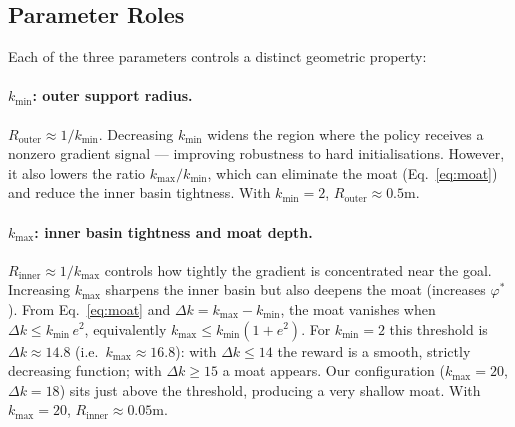 \documentclass{article}
\begin{document}
\subsection{Parameter Roles}

Each of the three parameters controls a distinct geometric property:

\paragraph{$k_{\min}$: outer support radius.}
$R_{\mathrm{outer}} \approx 1/k_{\min}$. Decreasing $k_{\min}$ widens the region where
the policy receives a nonzero gradient signal --- improving robustness to hard
initialisations. However, it also lowers the ratio $k_{\max}/k_{\min}$, which can
eliminate the moat (Eq.~\eqref{eq:moat}) and reduce the inner basin tightness.
With $k_{\min}=2$, $R_{\mathrm{outer}} \approx 0.5$m.

\paragraph{$k_{\max}$: inner basin tightness and moat depth.}
$R_{\mathrm{inner}} \approx 1/k_{\max}$ controls how tightly the gradient is
concentrated near the goal. Increasing $k_{\max}$ sharpens the inner basin but also
deepens the moat (increases $\varphi^*$). From Eq.~\eqref{eq:moat} and
$\Delta k = k_{\max} - k_{\min}$, the moat vanishes when $\Delta k \leq k_{\min}\,e^2$,
equivalently $k_{\max} \leq k_{\min}(1+e^2)$. For $k_{\min}=2$ this threshold is
$\Delta k \approx 14.8$ (i.e.\ $k_{\max} \approx 16.8$): with $\Delta k \leq 14$ the
reward is a smooth, strictly decreasing function; with $\Delta k \geq 15$ a moat
appears. Our configuration ($k_{\max}=20$, $\Delta k = 18$) sits just above the threshold,
producing a very shallow moat. With $k_{\max}=20$, $R_{\mathrm{inner}} \approx 0.05$m.
\end{document}
